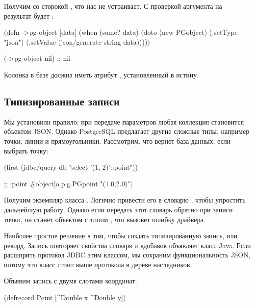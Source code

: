Получим  со сторокой , что нас не устраивает. С проверкой аргумента на  результат будет :

\begin{english}
  \begin{clojure}
(defn ->pg-object [data]
  (when (some? data)
    (doto (new PGobject)
      (.setType "json")
      (.setValue (json/generate-string data)))))

(->pg-object nil) ;; nil
  \end{clojure}
\end{english}

Колонка в базе должна иметь атрибут , установленный в истину.

\subsection{Типизированные записи}

Мы установили правило: при передаче параметров любая коллекция становится объектом JSON. Однако PostgreSQL предлагает другие сложные типы, например точки, линии и прямоугольники. Рассмотрим, что вернет база данных, если выбрать точку:

\begin{english}
  \begin{clojure}
(first
  (jdbc/query db "select '(1, 2)'::point"))

;; {:point #object[o.p.g.PGpoint "(1.0,2.0)"]}
  \end{clojure}
\end{english}

Получим экземпляр класса . Логично привести его в словарю , чтобы упростить дальнейшую работу. Однако если передать этот словарь обратно при записи точки, он станет объектом  с типом , что вызовет ошибку драйвера.


Наиболее простое решение в том, чтобы создать типизированную запись, или р\'{е}корд. Запись повторяет свойства словаря и вдобавок объявляет класс Java. Если расширить протокол JDBC этим классом, мы сохраним функциональность JSON, потому что класс стоит выше протокола  в дереве наследников.

Объявим запись с двумя слотами координат:

\begin{english}
  \begin{clojure}
(defrecord Point
  [^Double x ^Double y])
  \end{clojure}
\end{english}

